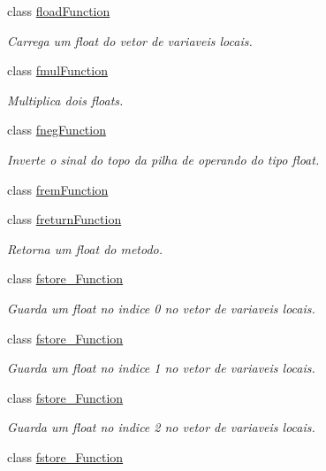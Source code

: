 \begin{DoxyCompactItemize}
class \hyperlink{classInstruction_1_1floadFunction}{fload\+Function}
\begin{DoxyCompactList}\small\item\em Carrega um float do vetor de variaveis locais. \end{DoxyCompactList}\item 
class \hyperlink{classInstruction_1_1fmulFunction}{fmul\+Function}
\begin{DoxyCompactList}\small\item\em Multiplica dois floats. \end{DoxyCompactList}\item 
class \hyperlink{classInstruction_1_1fnegFunction}{fneg\+Function}
\begin{DoxyCompactList}\small\item\em Inverte o sinal do topo da pilha de operando do tipo float. \end{DoxyCompactList}\item 
class \hyperlink{classInstruction_1_1fremFunction}{frem\+Function}
\item 
class \hyperlink{classInstruction_1_1freturnFunction}{freturn\+Function}
\begin{DoxyCompactList}\small\item\em Retorna um float do metodo. \end{DoxyCompactList}\item 
class \hyperlink{classInstruction_1_1fstore__0Function}{fstore\+\_\+Function}
\begin{DoxyCompactList}\small\item\em Guarda um float no indice 0 no vetor de variaveis locais. \end{DoxyCompactList}\item 
class \hyperlink{classInstruction_1_1fstore__1Function}{fstore\+\_\+Function}
\begin{DoxyCompactList}\small\item\em Guarda um float no indice 1 no vetor de variaveis locais. \end{DoxyCompactList}\item 
class \hyperlink{classInstruction_1_1fstore__2Function}{fstore\+\_\+Function}
\begin{DoxyCompactList}\small\item\em Guarda um float no indice 2 no vetor de variaveis locais. \end{DoxyCompactList}\item 
class \hyperlink{classInstruction_1_1fstore__3Function}{fstore\+\_\+Function}

\end{DoxyCompactItemize}
